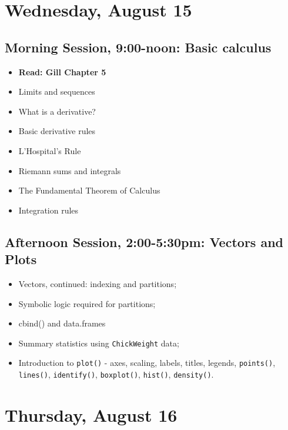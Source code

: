 \documentclass[12pt,a4paper]{article}
\begin{document}
\section*{Wednesday, August 15}
\subsection*{Morning Session, 9:00-noon: Basic calculus}
\begin{itemize}
\setlength{\itemsep}{0pt}
\footnotesize
\item \textbf{Read: Gill Chapter 5}
\item Limits and sequences
\item What is a derivative?
\item Basic derivative rules
\item L'Hospital's Rule
\item Riemann sums and integrals
\item The Fundamental Theorem of Calculus
\item Integration rules

\end{itemize}

\subsection*{Afternoon Session, 2:00-5:30pm: Vectors and Plots}
\begin{itemize}
\setlength{\itemsep}{0pt}
\footnotesize
\item Vectors, continued: indexing and partitions;
\item Symbolic logic required for partitions;
\item cbind() and data.frames
\item Summary statistics using \texttt{ChickWeight} data;
\item Introduction to \texttt{plot()} - axes, scaling, labels, titles, legends, \texttt{points()}, \texttt{lines()}, \texttt{identify()}, \texttt{boxplot()}, \texttt{hist()}, \texttt{density()}.
\end{itemize}


\section*{Thursday, August 16}
\end{document}
